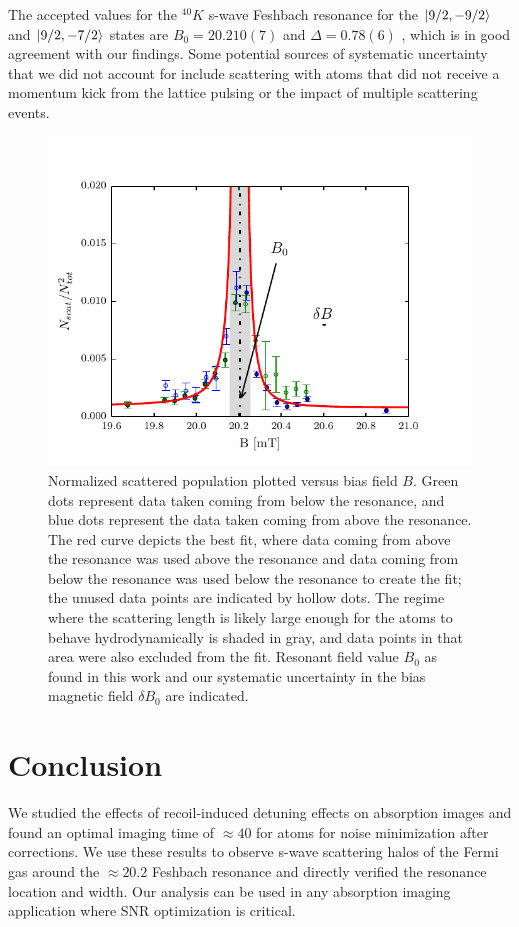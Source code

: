 \documentclass[12pt]{iopart}
\begin{document}
The accepted values for the $^{40}K$ s-wave Feshbach resonance for the  $\mathinner{|{9/2,-9/2}\rangle}$ and $\mathinner{|{9/2,-7/2}\rangle}$ states are $B_0=20.210(7)$  \mT{} and $\Delta=0.78(6)$  \mT{} \cite{Regal04}, which is in good agreement with our findings. Some potential sources of systematic uncertainty that we did not account for include scattering with atoms that did not receive a momentum kick from the lattice pulsing or the impact of multiple scattering events.
\begin{figure}
	\includegraphics{figure11.pdf}
\caption{Normalized scattered population plotted versus bias field $B$. Green dots represent data taken coming from below the resonance, and blue dots represent the data taken coming from above the resonance. The red curve depicts the best fit, where data coming from above the resonance was used above the resonance and data coming from below the resonance was used below the resonance to create the fit; the unused data points are indicated by hollow dots. The regime where the scattering length is likely large enough for the atoms to behave hydrodynamically is shaded in gray, and data points in that area were also excluded from the fit. Resonant field value $B_0$ as found in this work and our systematic uncertainty in the bias magnetic field $\delta B_0$ are indicated.    }
\label{fig:fittedFractions}
\end{figure}
\section{Conclusion}
We studied the effects of recoil-induced detuning effects on absorption images and found an optimal imaging time of $\approx40$ \us{} for \K{} atoms for noise minimization after corrections. We use these results to observe s-wave scattering halos of the Fermi gas around the $\approx 20.2$ \mT{} Feshbach resonance and directly verified the resonance location and width. Our analysis can be used in any absorption imaging application where SNR optimization is critical.
\end{document}
